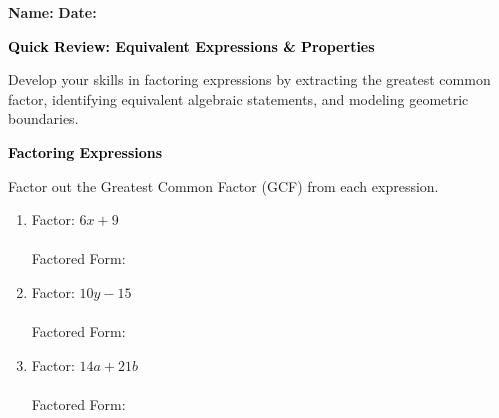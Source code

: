 \documentclass[12pt, letterpaper, fleqn]{article}
\newcommand{\blanklong}{\underline{\hspace{6.5cm}}}
\begin{document}
\textbf{Name:} \underline{\hspace{5cm}}
\hfill
\textbf{Date:} \underline{\hspace{3cm}}\\

\begin{tcolorbox}[colback=black!10]
    \large\textcolor{black}{\textbf{Quick Review: Equivalent Expressions \& Properties}}
\end{tcolorbox}

\vspace{3mm}
\noindent
Develop your skills in factoring expressions by extracting the greatest common factor, identifying equivalent algebraic statements, and modeling geometric boundaries.

\vspace{4mm}

\begin{tcolorbox}[colback=black!10]
\large\textcolor{black}{\textbf{Factoring Expressions}}
\end{tcolorbox}

\noindent
Factor out the Greatest Common Factor (GCF) from each expression.

\vspace{3mm}

\begin{enumerate}[itemsep=1.5cm, leftmargin=0.6cm]

\item Factor: $6x + 9$ \\ \\
Factored Form: \blanklong

\vspace{1.5cm}

\item Factor: $10y - 15$ \\ \\
Factored Form: \blanklong

\vspace{1.5cm}

\item Factor: $14a + 21b$ \\ \\
Factored Form: \blanklong

\vspace{1.5cm}

\end{enumerate}
\end{document}
